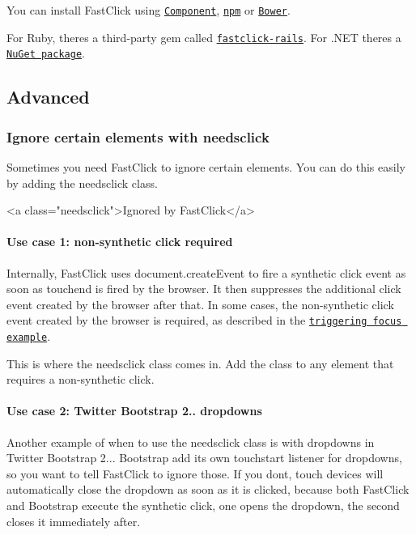 You can install Fast\+Click using \href{https://github.com/component/component}{\tt Component}, \href{https://npmjs.org/package/fastclick}{\tt npm} or \href{http://bower.io/}{\tt Bower}.

For Ruby, there\textquotesingle{}s a third-\/party gem called \href{http://rubygems.org/gems/fastclick-rails}{\tt fastclick-\/rails}. For .N\+ET there\textquotesingle{}s a \href{http://nuget.org/packages/FastClick}{\tt Nu\+Get package}.

\subsection*{Advanced}

\subsubsection*{Ignore certain elements with {\ttfamily needsclick}}

Sometimes you need Fast\+Click to ignore certain elements. You can do this easily by adding the {\ttfamily needsclick} class. 
\begin{DoxyCode}
<a class="needsclick">Ignored by FastClick</a>
\end{DoxyCode}


\paragraph*{Use case 1\+: non-\/synthetic click required}

Internally, Fast\+Click uses {\ttfamily document.\+create\+Event} to fire a synthetic {\ttfamily click} event as soon as {\ttfamily touchend} is fired by the browser. It then suppresses the additional {\ttfamily click} event created by the browser after that. In some cases, the non-\/synthetic {\ttfamily click} event created by the browser is required, as described in the \href{http://ftlabs.github.com/fastclick/examples/focus.html}{\tt triggering focus example}.

This is where the {\ttfamily needsclick} class comes in. Add the class to any element that requires a non-\/synthetic click.

\paragraph*{Use case 2\+: Twitter Bootstrap 2.. dropdowns}

Another example of when to use the {\ttfamily needsclick} class is with dropdowns in Twitter Bootstrap 2... Bootstrap add its own {\ttfamily touchstart} listener for dropdowns, so you want to tell Fast\+Click to ignore those. If you don\textquotesingle{}t, touch devices will automatically close the dropdown as soon as it is clicked, because both Fast\+Click and Bootstrap execute the synthetic click, one opens the dropdown, the second closes it immediately after.


